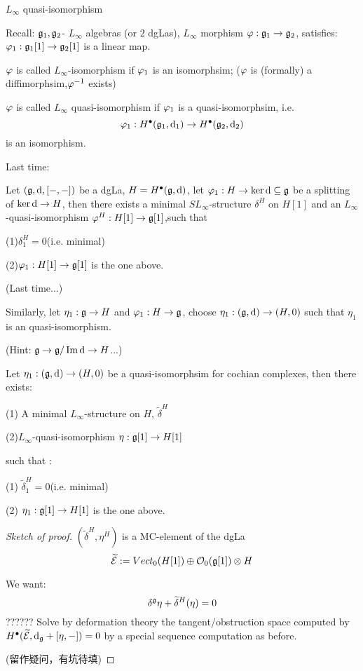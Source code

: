 
$L_\infty$ quasi-isomorphism

Recall:
$\mathfrak{g}_1,\mathfrak{g}_2$- $L_\infty$ algebras (or $2$ dgLas),
$L_\infty$ morphism $\varphi:\mathfrak{g}_1\to \mathfrak{g}_2$,
satisfies: $\varphi_1:\mathfrak{g}_1[1]\to\mathfrak{g}_2[1]$
is a linear map.

$\varphi$ is called $L_\infty$-isomorphism if $\varphi_1$ is an isomorphsim;
($\varphi$ is (formally) a diffimorphsim,$\varphi^{-1}$ exists)


$\varphi$ is called $L_\infty$ quasi-isomorphism if $\varphi_1$
is a quasi-isomorphsim, i.e.
$$\varphi_1:H^{\bullet}(\mathfrak{g}_1,\mathrm{d}_1)\to H^{\bullet}(\mathfrak{g}_2,\mathrm{d}_2)$$
is an isomorphism.

Last time:
\begin{prop}
Let $(\mathfrak{g},\mathrm{d},[-,-])$ be a dgLa, $H=H^{\bullet}(\mathfrak{g},\mathrm{d})$,
let $\varphi_1:H\to \ker\mathrm{d}\subseteq\mathfrak{g}$ be a splitting of $\ker\mathrm{d}\to H$,
then there exists a minimal $SL_\infty$-structure $\delta^H$ on $H[1]$
and an $L_\infty$-quasi-isomorphism
$\varphi^H:H[1]\to\mathfrak{g}[1]$,such that

(1)$\delta_1^H=0$(i.e. minimal)

(2)$\varphi_1:H[1]\to\mathfrak{g}[1]$ is the one above.
\end{prop}

(Last time...)

Similarly, let $\eta_1:\mathfrak{g}\to H$ and $\varphi_1:H\to\mathfrak{g}$,
choose $\eta_1:(\mathfrak{g},\mathrm{d})\to (H,0)$
such that $\eta_1$ is an quasi-isomorphism.

(Hint: $\mathfrak{g}\to\mathfrak{g}/\operatorname{Im}\mathrm{d}\to H$...)

\begin{prop}
Let $\eta_1:(\mathfrak{g},\mathrm{d})\to (H,0)$ be a quasi-isomorphsim
for cochian complexes, then there exists:

(1) A minimal $L_\infty$-structure on $H$, $\widetilde{\delta}^H$

(2)$L_\infty$-quasi-isomorphism $\eta:\mathfrak{g}[1]\to H[1]$

such that :

(1) $\widetilde{\delta}_1^H=0$(i.e. minimal)

(2) $\eta_1:\mathfrak{g}[1]\to H[1]$ is the one above.
\end{prop}

\begin{proof}[Sketch of proof]

$(\widetilde{\delta}^H,\eta^H)$ is a MC-element of the dgLa
$$\widetilde{\mathcal{E}}:=Vect_0(H[1])\oplus\mathcal{O}_0(\mathfrak{g}[1])\otimes H$$

We want:
{\color{gray}
  $$\delta^{\mathfrak{g}}\eta+\widetilde{\delta}^H(\eta)=0$$
??????
}
Solve by deformation theory the tangent/obstruction space computed by
$H^{\bullet}(\widetilde{\mathcal{E}},\mathrm{d}_{\mathfrak{g}}+[\eta,-])=0$
by a special sequence computation as before.

(留作疑问，有坑待填)
\end{proof}

